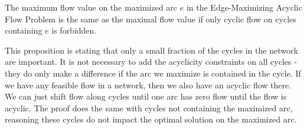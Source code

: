 \begin{prop}
  The maximum flow value on the maximized arc $e$ in the Edge-Maximizing Acyclic Flow Problem is the same as the 
  maximal flow value if only cyclic flow on cycles containing $e$ is forbidden. 
\end{prop}
This proposition is stating that only a small fraction of the cycles in the network are important. It is not necessary 
to add the acyclicity constraints on all cycles - they do only make a difference if the arc we maximize is contained in 
the cycle. If we have any feasible flow in a network, then we also have an acyclic flow there. We can just shift flow 
along cycles until one arc has zero flow until the flow is acyclic. The proof does the same with cycles not containing 
the maximized arc, reasoning these cycles do not impact the optimal solution on the maximized arc.
